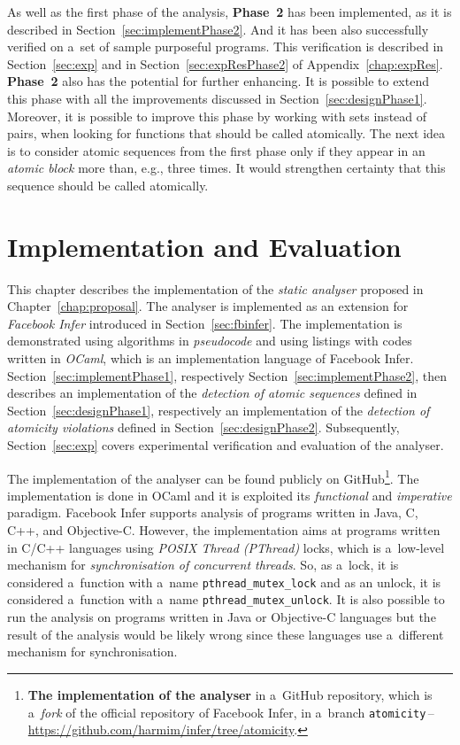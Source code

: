 As well as the first phase of the analysis, \textbf{Phase~2} has been
implemented, as it is described in Section~\ref{sec:implementPhase2}.
And it has been also successfully verified on a~set of sample purposeful
programs. This verification is described in
Section~\ref{sec:exp} and in Section~\ref{sec:expResPhase2} of
Appendix~\ref{chap:expRes}. \textbf{Phase~2} also has the potential for
further enhancing. It is possible to extend this phase with all the
improvements discussed in Section~\ref{sec:designPhase1}. Moreover, it
is possible to improve this phase by working with sets instead of pairs,
when looking for functions that should be called atomically. The next idea
is to consider atomic sequences from the first phase only if they appear
in an \emph{atomic block} more than, e.g., three times. It would strengthen
certainty that this sequence should be called atomically.



\chapter{Implementation and Evaluation}
\label{chap:implementExp}

This chapter describes the implementation of the \emph{static analyser}
proposed in Chapter~\ref{chap:proposal}. The analyser is implemented as an
extension for \emph{Facebook Infer} introduced in Section~\ref{sec:fbinfer}.
The implementation is demonstrated using algorithms in \emph{pseudocode}
and using listings with codes written in \emph{OCaml}, which is an
implementation language of Facebook Infer. Section~\ref{sec:implementPhase1},
respectively Section~\ref{sec:implementPhase2}, then describes an
implementation of the \emph{detection of atomic sequences} defined in
Section~\ref{sec:designPhase1}, respectively an implementation of the
\emph{detection of atomicity violations} defined in
Section~\ref{sec:designPhase2}. Subsequently, Section~\ref{sec:exp}
covers experimental verification and evaluation of the analyser.

The implementation of the analyser can be found publicly on
GitHub\footnote{\textbf{The implementation of the analyser} in a~GitHub
repository, which is a~\emph{fork} of the official repository of Facebook
Infer, in a~branch
\texttt{atomicity}\,--\,\url{https://github.com/harmim/infer/tree/atomicity}.}.
The implementation is done in OCaml and it is exploited its \emph{functional}
and \emph{imperative} paradigm. Facebook Infer supports analysis of
programs written in Java, C, C++, and Objective-C. However, the implementation
aims at programs written in C/C++ languages using \emph{POSIX Thread
(PThread)} locks, which is a~low-level mechanism for \emph{synchronisation
of concurrent threads}. So, as a~lock, it is considered a~function with
a~name \texttt{pthread\_mutex\_lock} and as an unlock, it is considered
a~function with a~name \texttt{pthread\_mutex\_unlock}. It is also possible to
run the analysis on programs written in Java or Objective-C languages but
the result of the analysis would be likely wrong since these languages use
a~different mechanism for synchronisation.

